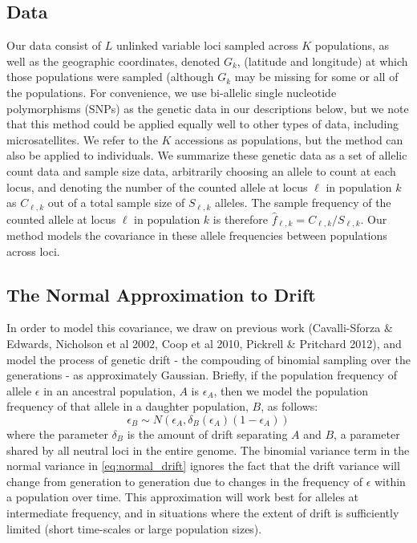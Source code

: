 \documentclass[12pt]{article}
\begin{document}

\subsection*{Data}
Our data consist of $L$ unlinked variable loci sampled across $K$ populations, as well as the geographic coordinates, denoted $G_k$, (latitude and longitude) at which those populations were sampled (although $G_k$ may be missing for some or all of the populations.  For convenience, we use bi-allelic single nucleotide polymorphisms (SNPs) as the genetic data in our descriptions below, but we note that this method could be applied equally well to other types of data, including microsatellites.  We refer to the $K$ accessions as populations, but the method can also be applied to individuals.  We summarize these genetic data as a set of allelic count data and sample size data, arbitrarily choosing an allele to count at each locus, and denoting the number of the counted allele at locus $\ell$ in population $k$ as $C_{\ell,k}$ out of a total sample size of $S_{\ell,k}$ alleles.  The sample frequency of the counted allele at locus $\ell$ in population $k$ is therefore $\hat{f}_{\ell,k} = C_{\ell,k}/S_{\ell,k}$.  Our method models the covariance in these allele frequencies between populations across loci.

\subsection*{The Normal Approximation to Drift}
In order to model this covariance, we draw on previous work (Cavalli-Sforza \& Edwards, Nicholson et al 2002, Coop et al 2010, Pickrell \& Pritchard 2012), and model the process of genetic drift - the compouding of binomial sampling over the generations - as approximately Gaussian.  Briefly, if the population frequency of allele $\epsilon$ in an ancestral population, $A$ is $\epsilon_A$, then we model the population frequency of that allele in a daughter population, $B$, as follows:
\begin{equation}
\label{eq:normal_drift}
\epsilon_B \sim N(\epsilon_A,\delta_B(\epsilon_A)(1-\epsilon_A))
\end{equation}
where the parameter  $\delta_B$ is the amount of drift separating $A$ and $B$, a parameter shared by all neutral loci in the entire genome.  The binomial variance term in the normal variance in \eqref{eq:normal_drift} ignores the fact that the drift variance will change from generation to generation due to changes in the frequency of $\epsilon$ within a population over time.  This approximation will work best for alleles at intermediate frequency, and in situations where the extent of drift is sufficiently limited (short time-scales or large population sizes). 
\end{document}
